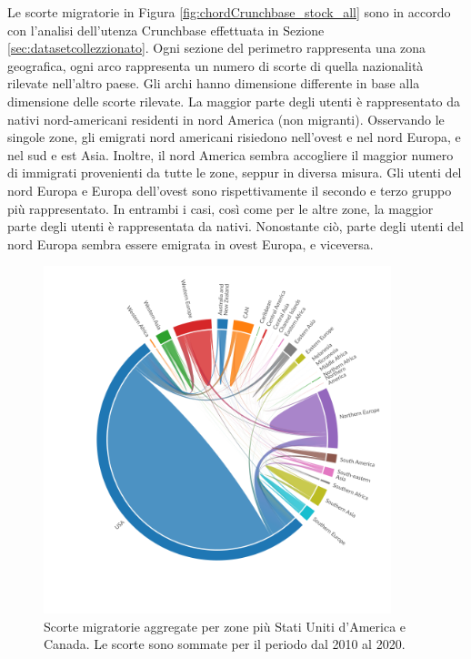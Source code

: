 Le scorte migratorie in Figura \ref{fig:chordCrunchbase_stock_all} sono in accordo con l'analisi dell'utenza Crunchbase effettuata in Sezione \ref{sec:datasetcollezzionato}. Ogni sezione del perimetro rappresenta una zona geografica, ogni arco rappresenta un numero di scorte di quella nazionalità rilevate nell'altro paese. Gli archi hanno dimensione differente in base alla dimensione delle scorte rilevate. La maggior parte degli utenti è rappresentato da nativi nord-americani residenti in nord America (non migranti). Osservando le singole zone, gli emigrati nord americani risiedono nell'ovest e nel nord Europa, e nel sud e est Asia. Inoltre, il nord America sembra accogliere il maggior numero di immigrati provenienti da tutte le zone, seppur in diversa misura.
Gli utenti del nord Europa e Europa dell'ovest sono rispettivamente il secondo e terzo gruppo più rappresentato. In entrambi i casi, così come per le altre zone, la maggior parte degli utenti è rappresentata da nativi. Nonostante ciò, parte degli utenti del nord Europa sembra essere emigrata in ovest Europa, e viceversa. 

\begin{figure}[htbp]
    \centering
    \includegraphics[width=0.9\textwidth]{images/SVG/Chords/stocks/stock_chord_USA_CAN_separate.png}
    \caption{Scorte migratorie aggregate per zone più Stati Uniti d'America e Canada. Le scorte sono sommate per il periodo dal 2010 al 2020.}
    \label{fig:chordCrunchbase_stock_usa_can}
\end{figure}

